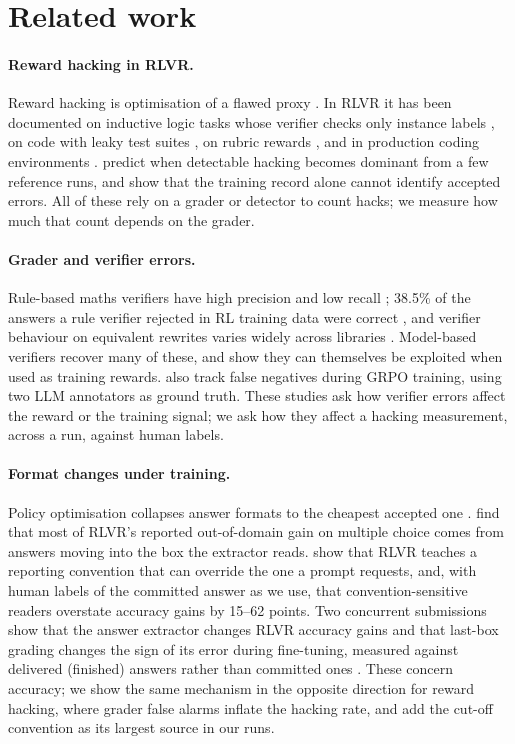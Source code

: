 \documentclass[10pt]{article}
\begin{document}
\section{Related work}
\paragraph{Reward hacking in RLVR.} Reward hacking is optimisation of a flawed proxy
\citep{amodei2016concrete,skalse2022defining,gao2023scaling}. In RLVR it has been documented on inductive
logic tasks whose verifier checks only instance labels \citep{helff2026gaming}, on code with leaky test
suites \citep{zhang2026leaky}, on rubric rewards \citep{wang2026rubric}, and in production coding
environments \citep{baker2025monitoring,anthropic2025emergent}. \citet{deng2026simhack} predict when
detectable hacking becomes dominant from a few reference runs, and \citet{moya2026verifier} show that the
training record alone cannot identify accepted errors. All of these rely on a grader or detector to count
hacks; we measure how much that count depends on the grader.

\paragraph{Grader and verifier errors.} Rule-based maths verifiers have high precision and low recall
\citep{huang2025verifiers}; 38.5\% of the answers a rule verifier rejected in RL training data were correct
\citep{xu2025tinyv}, and verifier behaviour on equivalent rewrites varies widely across libraries
\citep{xin2026verifier}. Model-based verifiers \citep{chen2025xverify,compassverifier} recover many of
these, and \citet{huang2025verifiers} show they can themselves be exploited when used as training rewards.
\citet{xu2025tinyv} also track false negatives during GRPO training, using two LLM annotators as ground truth. These studies ask how verifier errors affect the reward or the training signal; we ask how they affect a hacking measurement, across a run, against human labels.

\paragraph{Format changes under training.} Policy optimisation collapses answer formats to the cheapest
accepted one \citep{sanyal2026format}. \citet{lyu2026samebox} find that most of RLVR's reported
out-of-domain gain on multiple choice comes from answers moving into the box the extractor reads. \citet{chang2026reporting} show that RLVR teaches a reporting convention that can override the one a prompt requests, and, with human labels of the committed answer as we use, that convention-sensitive readers overstate accuracy gains by 15--62 points. Two concurrent submissions show that the answer extractor changes RLVR accuracy gains \citep{anon2027extractor}
and that last-box grading changes the sign of its error during fine-tuning, measured against delivered (finished) answers rather than committed ones \citep{anon2027strict}. These
concern accuracy; we show the same mechanism in the opposite direction for reward hacking, where grader
false alarms inflate the hacking rate, and add the cut-off convention as its largest source in our runs.
\end{document}
